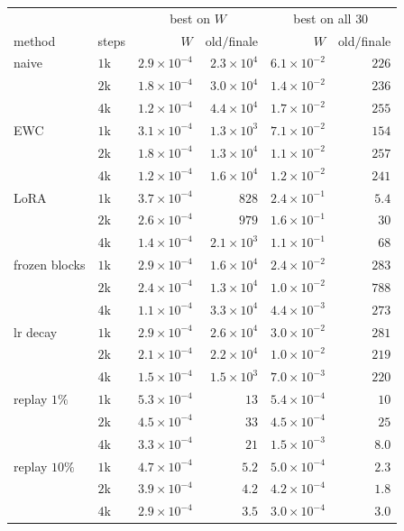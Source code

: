 \documentclass[11pt]{article}
\begin{document}
\begin{center}\small
\begin{tabular}{llrrrr}
\toprule
& & \multicolumn{2}{c}{best on $W$} & \multicolumn{2}{c}{best on all $30$} \\
method & steps & $W$ & old$/$finale & $W$ & old$/$finale \\
\midrule
naive & $1$k & $2.9\times10^{-4}$ & $2.3\times10^{4}$ & $6.1\times10^{-2}$ & $226$ \\
 & $2$k & $1.8\times10^{-4}$ & $3.0\times10^{4}$ & $1.4\times10^{-2}$ & $236$ \\
 & $4$k & $1.2\times10^{-4}$ & $4.4\times10^{4}$ & $1.7\times10^{-2}$ & $255$ \\
EWC & $1$k & $3.1\times10^{-4}$ & $1.3\times10^{3}$ & $7.1\times10^{-2}$ & $154$ \\
 & $2$k & $1.8\times10^{-4}$ & $1.3\times10^{4}$ & $1.1\times10^{-2}$ & $257$ \\
 & $4$k & $1.2\times10^{-4}$ & $1.6\times10^{4}$ & $1.2\times10^{-2}$ & $241$ \\
LoRA & $1$k & $3.7\times10^{-4}$ & $828$ & $2.4\times10^{-1}$ & $5.4$ \\
 & $2$k & $2.6\times10^{-4}$ & $979$ & $1.6\times10^{-1}$ & $30$ \\
 & $4$k & $1.4\times10^{-4}$ & $2.1\times10^{3}$ & $1.1\times10^{-1}$ & $68$ \\
frozen blocks & $1$k & $2.9\times10^{-4}$ & $1.6\times10^{4}$ & $2.4\times10^{-2}$ & $283$ \\
 & $2$k & $2.4\times10^{-4}$ & $1.3\times10^{4}$ & $1.0\times10^{-2}$ & $788$ \\
 & $4$k & $1.1\times10^{-4}$ & $3.3\times10^{4}$ & $4.4\times10^{-3}$ & $273$ \\
lr decay & $1$k & $2.9\times10^{-4}$ & $2.6\times10^{4}$ & $3.0\times10^{-2}$ & $281$ \\
 & $2$k & $2.1\times10^{-4}$ & $2.2\times10^{4}$ & $1.0\times10^{-2}$ & $219$ \\
 & $4$k & $1.5\times10^{-4}$ & $1.5\times10^{3}$ & $7.0\times10^{-3}$ & $220$ \\
replay $1\%$ & $1$k & $5.3\times10^{-4}$ & $13$ & $5.4\times10^{-4}$ & $10$ \\
 & $2$k & $4.5\times10^{-4}$ & $33$ & $4.5\times10^{-4}$ & $25$ \\
 & $4$k & $3.3\times10^{-4}$ & $21$ & $1.5\times10^{-3}$ & $8.0$ \\
replay $10\%$ & $1$k & $4.7\times10^{-4}$ & $5.2$ & $5.0\times10^{-4}$ & $2.3$ \\
 & $2$k & $3.9\times10^{-4}$ & $4.2$ & $4.2\times10^{-4}$ & $1.8$ \\
 & $4$k & $2.9\times10^{-4}$ & $3.5$ & $3.0\times10^{-4}$ & $3.0$ \\
\bottomrule
\end{tabular}
\end{center}
\end{document}

